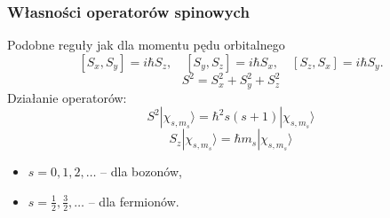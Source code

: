 \subsubsection*{Własności operatorów spinowych}
Podobne reguły jak dla momentu pędu orbitalnego
$$
[S_x, S_y] = i \hbar S_z, \quad [S_y, S_z] = i \hbar S_x, \quad [S_z, S_x] = i \hbar S_y.
$$
$$
S^2 = S_x^2 + S_y^2 + S_z^2
$$
Działanie operatorów:
$$
S^2 | \chi_{s, m_s} \rangle = \hbar^2 s(s+1) | \chi_{s, m_s} \rangle
$$
$$
S_z | \chi_{s, m_s} \rangle = \hbar m_s | \chi_{s, m_s} \rangle
$$
\begin{itemize}
\item $s = 0, 1, 2, \dots$ -- dla bozonów,
\item $s = \frac{1}{2}, \frac{3}{2}, \dots$ -- dla fermionów.
\end{itemize}

